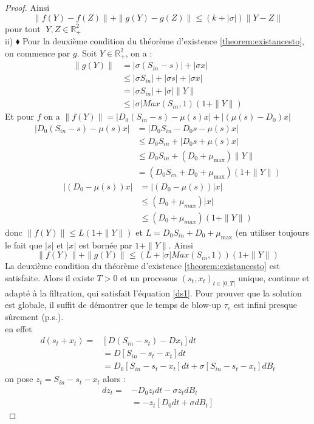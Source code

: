 \documentclass[12pt,a4paper]{report}%
\begin{document}
\begin{proof}
 	Ainsi 
 	$$
 	\|f(Y)-f(Z)\|+\|g(Y)-g(Z)\|\leq (k+|\sigma|) \|Y-Z\| 
 	$$
 	pour tout $\;Y,Z \in \mathbb{R}^2_+$\\
 	ii) $\blacklozenge$ Pour la deuxième condition du théorème d'existence \ref{theorem:existancesto}, on commence par \( g \). Soit \( Y \in \mathbb{R}^2_+ \), on a :
 	\begin{align*}
 		\|g(Y)\| &= |\sigma( S_{in}-s)|+|\sigma x| \\
 		&\leqslant |\sigma S_{in}|+|\sigma s|+|\sigma x|\\
 		&=|\sigma S_{in}|+|\sigma| \|Y\|\\
 		&\leqslant |\sigma| Max(S_{in},1)(1+\|Y\|)
 	\end{align*}
 	Et pour $f$ on a $\|f(Y)\|=|D_0(S_{in}-s) - \mu(s)x|+|(\mu(s)-D_0) x|$
 	\begin{align*}
 		|D_0(S_{in}-s) - \mu(s)x| & = |D_0 S_{in}-D_0 s - \mu(s)x| \\
 		& \leqslant D_0 S_{in}+|D_0 s + \mu(s)x| \\
 		& \leqslant D_0 S_{in}+(D_0+\mu_{\text{max}})\|Y\| \\
 		& = (D_0 S_{in}+D_0+\mu_{\text{max}})(1+\|Y\|)
 	\end{align*}
 	\begin{align*}
 		|(D_0 - \mu(s))x| & = |(D_0 - \mu(s))|x| \\
 		& \leqslant (D_0 + \mu_{max})|x| \\
 		& \leqslant (D_0 + \mu_{max})(1+\|Y\|)
 	\end{align*}
 	donc 
 	$\|f(Y)\|\leqslant L(1+\|Y\|)$ et $L=D_0 S_{in}+D_0+\mu_{\text{max}}$ (en utiliser toujours le fait que \(|s| \)  et \(|x| \) est bornée par \( 1 + \|Y\| \). Ainsi 
 	$$
 	\|f(Y)\|+\|g(Y)\|\leq (L+|\sigma| Max(S_{in},1))\left( 1+ \|Y\| \right) 
 	$$
 	La deuxième condition du théorème d'existence \ref{theorem:existancesto} est satisfaite. Alors il existe $T>0 $ et un processus $(s_t, x_t)_{t \in [0,T[}$ unique, continue et adapté à la filtration, qui satisfait l'équation \eqref{ds1}.
 	Pour prouver que la solution est globale, il suffit de démontrer que le temps de blow-up \(\tau_e\) est infini presque sûrement (p.s.).\\
 	
 	en effet 
 	\[
 	\begin{aligned}
 		d(s_t+x_t)=&[D(S_{in}-s_t)-D x_t]dt \\
 		&=D[S_{in}-s_t-x_t]dt\\
 		&=D_0[S_{in}-s_t-x_t]dt+ \sigma [S_{in}-s_t-x_t]dB_t
 	\end{aligned}
 	\]
 	on pose $z_t=S_{in}-s_t-x_t$ alors :
 	\[
 	\begin{aligned}
 		dz_t=&-D_0 z_tdt- \sigma z_tdB_t\\
 		&=-z_t[D_0dt + \sigma dB_t]
 	\end{aligned}
 	\]
 	

\end{proof}
\end{document}
